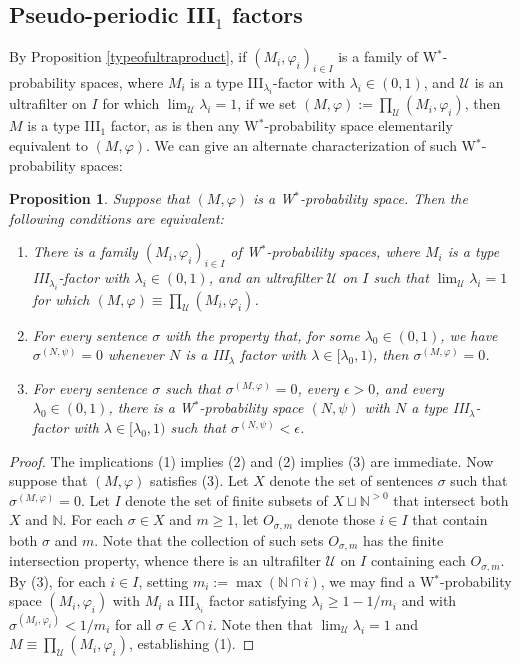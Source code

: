 \documentclass[12pt]{amsart}
\newtheorem{prop}[thm]{Proposition}
\theoremstyle{definition}
\def\bb{\mathbb}
\def\bb{\mathbb}
\def\u{\mathsf 1}
\def \u{\mathcal U}
\begin{document}
\subsection{Pseudo-periodic III$_1$ factors}
By Proposition \ref{typeofultraproduct}, if $(M_i,\varphi_i)_{i\in I}$ is a family of W$^*$-probability spaces, where $M_i$ is a type III$_{\lambda_i}$-factor with $\lambda_i\in (0,1)$, 
and $\u$ is an ultrafilter on $I$ for which $\lim_\u \lambda_i=1$, if we set $(M,\varphi):=\prod_\u (M_i,\varphi_i)$, then $M$ is a type III$_1$ factor, as is then any W$^*$-probability space elementarily equivalent to $(M,\varphi)$.  We can give an alternate characterization of such W$^*$-probability spaces:  

\begin{prop}\label{pseudoperiodicequivalence}
Suppose that $(M,\varphi)$ is a W$^*$-probability space. Then the following conditions are equivalent:
\begin{enumerate}
    \item There is a family $(M_i,\varphi_i)_{i\in I}$ of W$^*$-probability spaces, where $M_i$ is a type III$_{\lambda_i}$-factor with $\lambda_i\in (0,1)$, and an ultrafilter $\u$ on $I$ such that $\lim_\u \lambda_i=1$ for which $(M,\varphi)\equiv \prod_\u (M_i,\varphi_i)$.
    \item For every sentence $\sigma$ with the property that, for some $\lambda_0\in (0,1)$, we have $\sigma^{(N,\psi)}=0$ whenever $N$ is a III$_\lambda$ factor with $\lambda\in [\lambda_0,1)$, then $\sigma^{(M,\varphi)}=0$.
    \item For every sentence $\sigma$ such that $\sigma^{(M,\varphi)}=0$, every $\epsilon>0$, and every $\lambda_0\in (0,1)$, there is a W$^*$-probability space $(N,\psi)$ with $N$ a type III$_\lambda$-factor with $\lambda\in [\lambda_0,1)$ such that $\sigma^{(N,\psi)}<\epsilon$.
\end{enumerate}
\end{prop}

\begin{proof}
The implications (1) implies (2) and (2) implies (3) are immediate.  Now suppose that $(M,\varphi)$ satisfies (3).  Let $X$ denote the set of sentences $\sigma$ such that $\sigma^{(M,\varphi)}=0$.  Let $I$ denote the set of finite subsets of $X\sqcup \bb N^{>0}$ that intersect both $X$ and $\bb N$.  For each $\sigma\in X$ and $m\geq 1$, let $O_{\sigma,m}$ denote those $i\in I$ that contain both $\sigma$ and $m$.  Note that the collection of such sets $O_{\sigma,m}$ has the finite intersection property, whence there is an ultrafilter $\u$ on $I$ containing each $O_{\sigma,m}$.  By (3), for each $i\in I$, setting $m_i:=\max (\bb N\cap i)$, we may find a W$^*$-probability space $(M_i,\varphi_i)$ with $M_i$ a III$_{\lambda_i}$ factor satisfying $\lambda_i\geq 1-1/{m_i}$ and with $\sigma^{(M_i,\varphi_i)}<1/m_i$ for all $\sigma\in X\cap i$.  Note then that $\lim_\u \lambda_i=1$ and $M\equiv \prod_\u (M_i,\varphi_i)$, establishing (1).
\end{proof}
\end{document}

